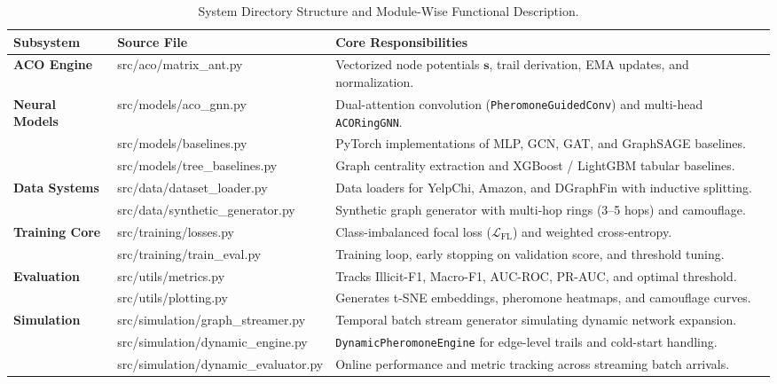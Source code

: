 \begin{table}[!htbp]
\centering
\begin{spacing}{1.0}
\scriptsize
\setlength{\tabcolsep}{3pt}
\renewcommand{\arraystretch}{1.02}
\caption[System Directory Structure and Module Descriptions]{System Directory Structure and Module-Wise Functional Description.}
\label{tab:repo_modules}
\begin{tabularx}{\textwidth}{@{}l >{\raggedright\arraybackslash\ttfamily}p{3.2cm} >{\raggedright\arraybackslash}X@{}}
\toprule
\textbf{Subsystem} & \textbf{Source File} & \textbf{Core Responsibilities} \\ \midrule
\textbf{ACO Engine} & src/aco/\allowbreak{}matrix\_\allowbreak{}ant.py & Vectorized node potentials $\mathbf{s}$, trail derivation, EMA updates, and normalization. \\
\midrule
\textbf{Neural Models} & src/models/\allowbreak{}aco\_\allowbreak{}gnn.py & Dual-attention convolution (\texttt{Pheromone\-Guided\-Conv}) and multi-head \texttt{ACORingGNN}. \\
 & src/models/\allowbreak{}baselines.py & PyTorch implementations of MLP, GCN, GAT, and GraphSAGE baselines. \\
 & src/models/\allowbreak{}tree\_\allowbreak{}baselines.py & Graph centrality extraction and XGBoost / LightGBM tabular baselines. \\
\midrule
\textbf{Data Systems} & src/data/\allowbreak{}dataset\_\allowbreak{}loader.py & Data loaders for YelpChi, Amazon, and DGraphFin with inductive splitting. \\
 & src/data/\allowbreak{}synthetic\_\allowbreak{}generator.py & Synthetic graph generator with multi-hop rings (3--5 hops) and camouflage. \\
\midrule
\textbf{Training Core} & src/training/\allowbreak{}losses.py & Class-imbalanced focal loss ($\mathcal{L}_{\text{FL}}$) and weighted cross-entropy. \\
 & src/training/\allowbreak{}train\_\allowbreak{}eval.py & Training loop, early stopping on validation score, and threshold tuning. \\
\midrule
\textbf{Evaluation} & src/utils/\allowbreak{}metrics.py & Tracks Illicit-F1, Macro-F1, AUC-ROC, PR-AUC, and optimal threshold. \\
 & src/utils/\allowbreak{}plotting.py & Generates t-SNE embeddings, pheromone heatmaps, and camouflage curves. \\
\midrule
\textbf{Simulation} & src/simulation/\allowbreak{}graph\_\allowbreak{}streamer.py & Temporal batch stream generator simulating dynamic network expansion. \\
 & src/simulation/\allowbreak{}dynamic\_\allowbreak{}engine.py & \texttt{Dynamic\-Pheromone\-Engine} for edge-level trails and cold-start handling. \\
 & src/simulation/\allowbreak{}dynamic\_\allowbreak{}evaluator.py & Online performance and metric tracking across streaming batch arrivals. \\
\bottomrule
\end{tabularx}
\end{spacing}
\end{table}

